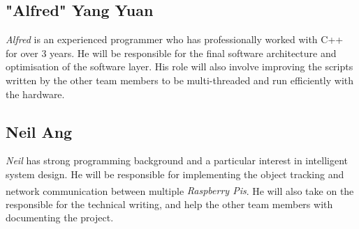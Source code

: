 \documentclass[11pt,a4paper,titlepage]{report}
\newcommand{\rpis}{\textit{Raspberry Pi\textsuperscript{\textregistered}s}}
\begin{document}
\subsection{"Alfred" Yang Yuan}
\textit{Alfred} is an experienced programmer who has professionally worked with C++ for over 3 years. He will be responsible for the final software architecture and optimisation of the software layer. His role will also involve improving the scripts written by the other team members to be multi-threaded and run efficiently with the hardware.

\subsection{Neil Ang}
\textit{Neil} has strong programming background and a particular interest in intelligent system design. He will be responsible for implementing the object tracking and network communication between multiple \rpis. He will also take on the responsible for the technical writing, and help the other team members with documenting the project. 
\end{document}
